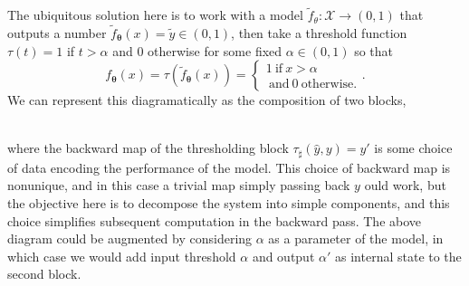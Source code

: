 \documentclass[10pt,a4paper]{article}
\begin{document}
The ubiquitous solution here is to work with a model $\tilde f_\theta:\mathcal X\rightarrow(0,1)$ that outputs a number $\tilde f_{\boldsymbol\theta}(x)=\tilde y\in(0,1)$, then take a threshold function $\tau(t)=1$ if $t>\alpha$ and $0$ otherwise for some fixed $\alpha\in(0,1)$ so that
$$
f_{\boldsymbol\theta}(x)=\tau(\tilde f_{\boldsymbol\theta}(x))=\begin{cases*}1~\text{if}~x>\alpha\\
~\text{and}~0~\text{otherwise.}\end{cases*}.
$$
We can represent this diagramatically as the composition of two blocks,\\
\\
where the backward map of the thresholding block $\tau_\sharp(\hat y,y)=y'$ is some choice of data encoding the performance of the model.
This choice of backward map is nonunique, and in this case a trivial map simply passing back $y$ ould work, but the objective here is to decompose the system into simple components, and this choice simplifies subsequent computation in the backward pass.
The above diagram could be augmented by considering $\alpha$ as a parameter of the model, in which case we would add input threshold $\alpha$ and output $\alpha'$ as internal state to the second block.
\end{document}
